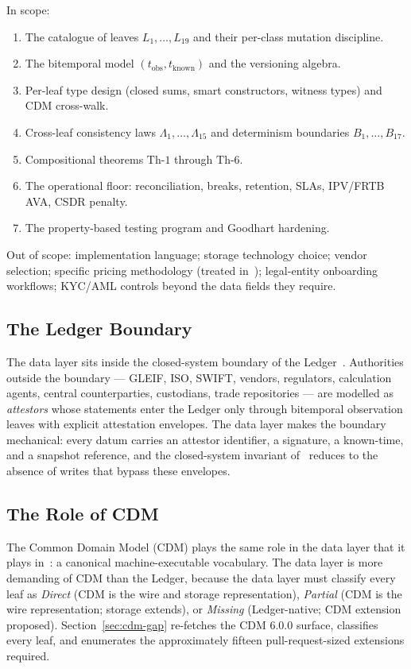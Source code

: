 \documentclass[11pt,a4paper]{article}
\begin{document}
In scope:
\begin{enumerate}[nosep]
\item The catalogue of leaves $L_1,\dots,L_{19}$ and their per-class mutation discipline.
\item The bitemporal model $(t_{\mathrm{obs}}, t_{\mathrm{known}})$ and the versioning algebra.
\item Per-leaf type design (closed sums, smart constructors, witness types) and CDM cross-walk.
\item Cross-leaf consistency laws $\Lambda_1,\dots,\Lambda_{15}$ and determinism boundaries $B_1,\dots,B_{17}$.
\item Compositional theorems $\mathrm{Th}\textrm{-}1$ through $\mathrm{Th}\textrm{-}6$.
\item The operational floor: reconciliation, breaks, retention, SLAs, IPV/FRTB AVA, CSDR penalty.
\item The property-based testing program and Goodhart hardening.
\end{enumerate}

Out of scope: implementation language; storage technology choice; vendor selection; specific pricing methodology (treated in~\cite{valuation}); legal-entity onboarding workflows; KYC/AML controls beyond the data fields they require.

\subsection{The Ledger Boundary}
\label{sec:intro-boundary}

The data layer sits inside the closed-system boundary of the Ledger~\cite[\S Scope and Limitations]{ledger}. Authorities outside the boundary --- GLEIF, ISO, SWIFT, vendors, regulators, calculation agents, central counterparties, custodians, trade repositories --- are modelled as \emph{attestors} whose statements enter the Ledger only through bitemporal observation leaves with explicit attestation envelopes. The data layer makes the boundary mechanical: every datum carries an attestor identifier, a signature, a known-time, and a snapshot reference, and the closed-system invariant of~\cite{ledger} reduces to the absence of writes that bypass these envelopes.

\subsection{The Role of CDM}
\label{sec:intro-cdm}

The Common Domain Model (CDM) plays the same role in the data layer that it plays in~\cite[\S CDM Integration]{ledger}: a canonical machine-executable vocabulary. The data layer is more demanding of CDM than the Ledger, because the data layer must classify every leaf as \emph{Direct} (CDM is the wire and storage representation), \emph{Partial} (CDM is the wire representation; storage extends), or \emph{Missing} (Ledger-native; CDM extension proposed). Section~\ref{sec:cdm-gap} re-fetches the CDM 6.0.0 surface, classifies every leaf, and enumerates the approximately fifteen pull-request-sized extensions required.
\end{document}

